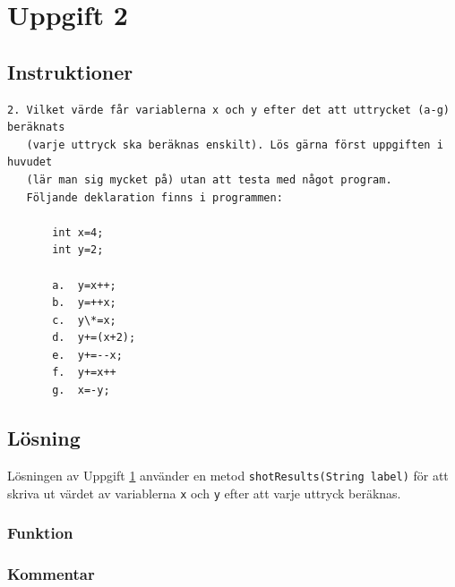 \section{Uppgift 2}\label{sec:uppg02}

\subsection{Instruktioner}
\begin{verbatim}
2. Vilket värde får variablerna x och y efter det att uttrycket (a-g) beräknats
   (varje uttryck ska beräknas enskilt). Lös gärna först uppgiften i huvudet
   (lär man sig mycket på) utan att testa med något program.
   Följande deklaration finns i programmen:

       int x=4;
       int y=2;

       a.  y=x++;
       b.  y=++x;
       c.  y\*=x;
       d.  y+=(x+2);
       e.  y+=--x;
       f.  y+=x++
       g.  x=-y;
\end{verbatim}

\subsection{Lösning}
Lösningen av Uppgift \ref{sec:uppg02} använder en metod
\texttt{shotResults(String label)} för att skriva ut värdet av variablerna
\texttt{x} och \texttt{y} efter att varje uttryck beräknas.

\subsubsection{Funktion}

\subsubsection{Kommentar}

%


